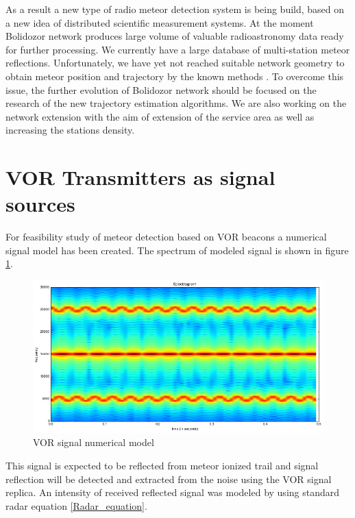 \documentclass[twoside]{ctuthesis}
\theoremstyle{plain}
\theoremstyle{definition}
\theoremstyle{note}
\begin{document}
As a result a new type of radio meteor detection system is being build, based on a new idea of distributed scientific measurement systems. At the moment Bolidozor network produces large volume of valuable radioastronomy data ready for further processing.  
We currently have a large database of multi-station meteor reflections. Unfortunately, we have yet not reached suitable network geometry to obtain meteor position and trajectory by the known methods \cite{Doppler_method}. 
To overcome this issue, the further evolution of Bolidozor network should be focused on the research of the new trajectory estimation algorithms. We are also working on the network extension with the aim of extension of the service area as well as increasing the stations density. 


\section{VOR Transmitters as signal sources}

For feasibility study of meteor detection based on VOR beacons a numerical signal model has been created. The spectrum of modeled signal is shown in figure \ref{VOR_signal}.

\begin{figure}
\includegraphics[width=\textwidth]{./img/VOR_signal.png}
\caption{VOR signal numerical model}
\label{VOR_signal}
\end{figure}

This signal is expected to be reflected from meteor ionized trail and signal reflection will be detected and extracted from the noise using the VOR signal replica. An intensity of received reflected signal was modeled by using standard radar equation \ref{Radar_equation}.
\end{document}
